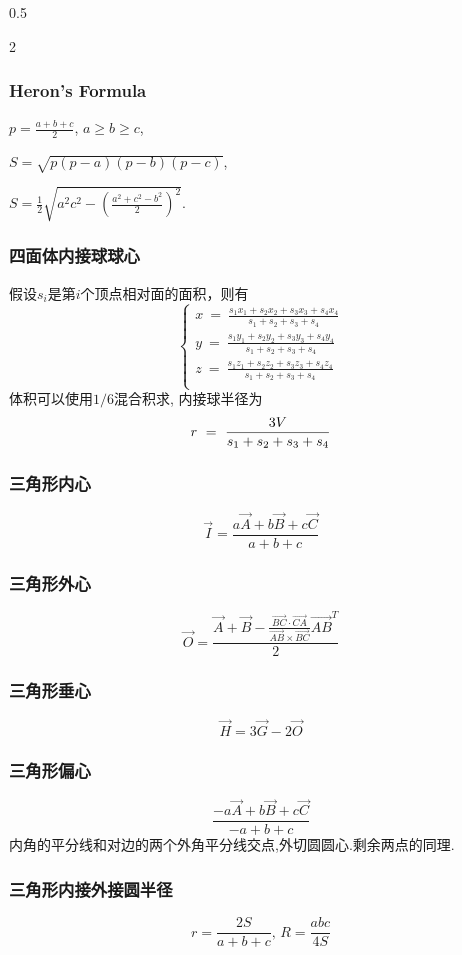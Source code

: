 \begin{small}
\begin{spacing}{0.5}
\begin{multicols*}{2}
	\subsubsection*{Heron's Formula}
	$p=\frac{a+b+c}{2}$, $a \geq b \geq c$, 

	$S=\sqrt{p(p-a)(p-b)(p-c)}$,

	$S=\frac{1}{2}\sqrt{a^2 c^2 - \left( \frac{a^2 + c^2 - b^2}{2} \right)^2}$.

\subsubsection*{四面体内接球球心}
假设$s_i$是第$i$个顶点相对面的面积，则有
\[\left\{
\begin{aligned}
x \ = \ \frac{s_1x_1+s_2x_2+s_3x_3+s_4x_4}{s_1+s_2+s_3+s_4}\\
y \ = \ \frac{s_1y_1+s_2y_2+s_3y_3+s_4y_4}{s_1+s_2+s_3+s_4}\\
z \ = \ \frac{s_1z_1+s_2z_2+s_3z_3+s_4z_4}{s_1+s_2+s_3+s_4}\\
\end{aligned}\right.\]
体积可以使用$1/6$混合积求, 内接球半径为
\[
r \ = \ \frac{3V}{s_1+s_2+s_3+s_4} \\
\]
\subsubsection*{三角形内心}
	\[ \vec{I} = \frac{a\vec {A} + b\vec{B} + c\vec{C}}{a + b + c} \]
\subsubsection*{三角形外心}
	\[ \vec{O} = \frac{\vec{A} + \vec{B} - \frac{\overrightarrow {BC} \cdot \overrightarrow{CA}}{\overrightarrow {AB} \times \overrightarrow{BC}}\overrightarrow {AB}^T}{2} \]
\subsubsection*{三角形垂心}
	\[ \vec{H} = 3\vec{G} - 2\vec{O} \]
\subsubsection*{三角形偏心}
	\[ \frac{-a\vec {A} + b\vec{B} + c\vec{C}}{-a + b + c} \]
	内角的平分线和对边的两个外角平分线交点,外切圆圆心.剩余两点的同理. 
\subsubsection*{三角形内接外接圆半径}
	\[ r=\frac{2S}{a+b+c},\, R=\frac{abc}{4S} \]

\end{multicols*}
\end{spacing}
\end{small}
